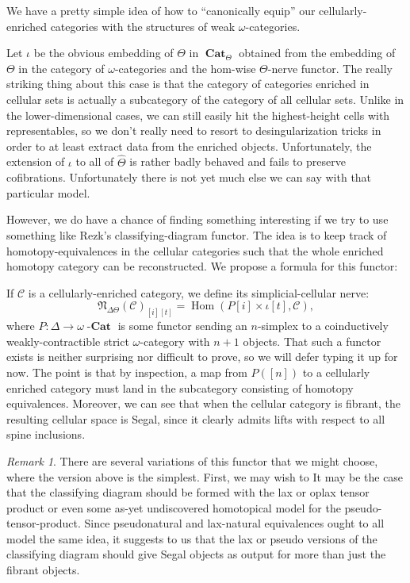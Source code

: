 \documentclass[a4paper,9pt]{amsart}
\theoremstyle{plain}   %
\theoremstyle{remark}
\newtheorem{rem}[thm]{Remark}
\theoremstyle{plain}
\DeclareMathOperator{\Cat}{\mathbf{Cat}}
\newcommand{\Hom}{{\operatorname{Hom}}}
\newcommand{\cellset}{\ensuremath{\widehat{\Theta}}}
\newcommand{\cat}[1]{{\operatorname{\mathbf{#1}}}}
\begin{document}
We have a pretty simple idea of how to ``canonically equip'' our cellularly-enriched categories with the structures of weak \(\omega\)-categories. 

Let  \(\iota\) be the obvious embedding of \(\Theta\) in \(\Cat_\Theta\) obtained from the embedding of \(\Theta\) in the category of \(\omega\)-categories and the hom-wise \(\Theta\)-nerve functor. The really striking thing about this case is that the category of categories enriched in cellular sets is actually a subcategory of the category of all cellular sets.  Unlike in the lower-dimensional cases, we can still easily hit the highest-height cells with representables,  so we don't really need to resort to desingularization tricks in order to at least extract data from the enriched objects.  Unfortunately, the extension of \(\iota\) to all of \(\cellset\) is rather badly behaved and fails to preserve cofibrations.  Unfortunately there is not yet much else we can say with that particular model.

However, we do have a chance of finding something interesting if we try to use something like Rezk's classifying-diagram functor.  The idea is to keep track of homotopy-equivalences in the cellular categories such that the whole enriched homotopy category can be reconstructed.  We propose a formula for this functor:

 If \(\mathcal{C}\) is a cellularly-enriched category, we define its simplicial-cellular nerve: \[\mathfrak{N}_{\Delta\Theta}(\mathcal{C})_{[i][t]}=\Hom(P[i] \times \iota[t], \mathcal{C}), \] where \(P:\Delta\to \omega\cat{-Cat}\) is some functor sending an \(n\)-simplex to a coinductively weakly-contractible strict \(\omega\)-category with \(n+1\) objects.  That such a functor exists is neither surprising nor difficult to prove, so we will defer typing it up for now.  The point is that by inspection, a map from \(P([n])\) to a cellularly enriched category must land in the subcategory consisting of homotopy equivalences.  Moreover, we can see that when the cellular category is fibrant, the resulting cellular space is Segal, since it clearly admits lifts with respect to all spine inclusions.  

\begin{rem}  There are several variations of this functor that we might choose, where the version above is the simplest.  First, we may wish to It may be the case that the classifying diagram  should be formed with the lax or oplax tensor product or even some as-yet undiscovered  homotopical model for the pseudo-tensor-product.  Since pseudonatural and lax-natural equivalences ought to all model  the same idea, it suggests to us that the lax or pseudo versions of the classifying diagram should give Segal objects as output for more than just the fibrant objects.  
\end{rem}
\end{document}
